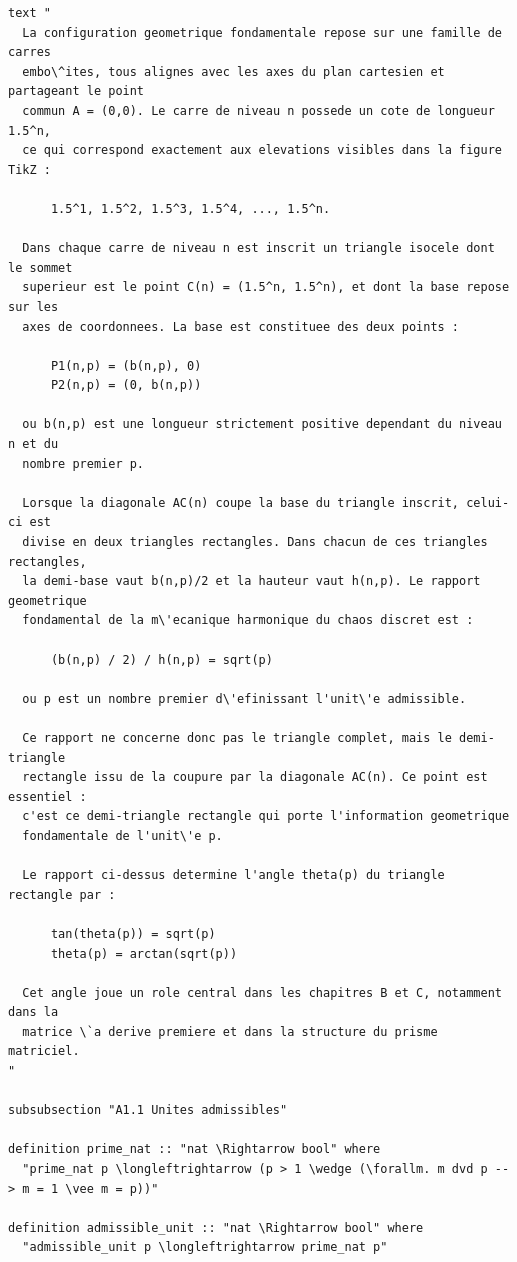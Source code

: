 \documentclass[12pt,a4paper]{article}
\begin{document}
\begin{verbatim}
text "
  La configuration geometrique fondamentale repose sur une famille de carres
  embo\^ites, tous alignes avec les axes du plan cartesien et partageant le point
  commun A = (0,0). Le carre de niveau n possede un cote de longueur 1.5^n,
  ce qui correspond exactement aux elevations visibles dans la figure TikZ :

      1.5^1, 1.5^2, 1.5^3, 1.5^4, ..., 1.5^n.

  Dans chaque carre de niveau n est inscrit un triangle isocele dont le sommet
  superieur est le point C(n) = (1.5^n, 1.5^n), et dont la base repose sur les
  axes de coordonnees. La base est constituee des deux points :

      P1(n,p) = (b(n,p), 0)
      P2(n,p) = (0, b(n,p))

  ou b(n,p) est une longueur strictement positive dependant du niveau n et du
  nombre premier p.

  Lorsque la diagonale AC(n) coupe la base du triangle inscrit, celui-ci est
  divise en deux triangles rectangles. Dans chacun de ces triangles rectangles,
  la demi-base vaut b(n,p)/2 et la hauteur vaut h(n,p). Le rapport geometrique
  fondamental de la m\'ecanique harmonique du chaos discret est :

      (b(n,p) / 2) / h(n,p) = sqrt(p)

  ou p est un nombre premier d\'efinissant l'unit\'e admissible.

  Ce rapport ne concerne donc pas le triangle complet, mais le demi-triangle
  rectangle issu de la coupure par la diagonale AC(n). Ce point est essentiel :
  c'est ce demi-triangle rectangle qui porte l'information geometrique
  fondamentale de l'unit\'e p.

  Le rapport ci-dessus determine l'angle theta(p) du triangle rectangle par :

      tan(theta(p)) = sqrt(p)
      theta(p) = arctan(sqrt(p))

  Cet angle joue un role central dans les chapitres B et C, notamment dans la
  matrice \`a derive premiere et dans la structure du prisme matriciel.
"

subsubsection "A1.1 Unites admissibles"

definition prime_nat :: "nat \Rightarrow bool" where
  "prime_nat p \longleftrightarrow (p > 1 \wedge (\forallm. m dvd p --> m = 1 \vee m = p))"

definition admissible_unit :: "nat \Rightarrow bool" where
  "admissible_unit p \longleftrightarrow prime_nat p"


\end{verbatim}
\end{document}
